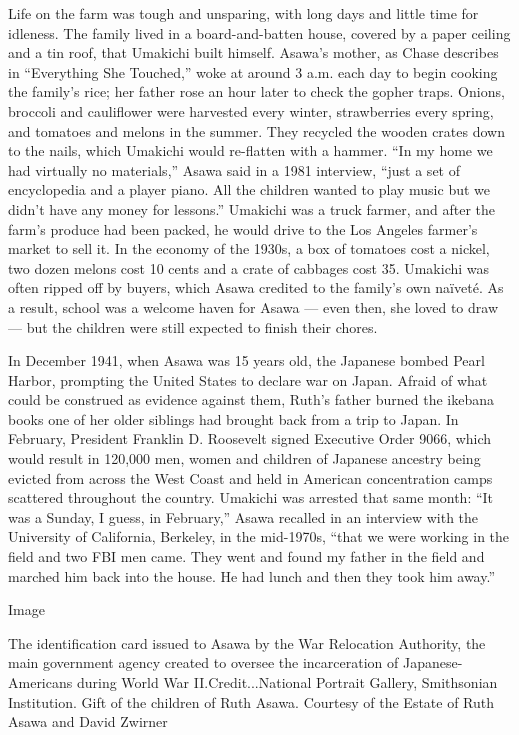 Life on the farm was tough and unsparing, with long days and little time
for idleness. The family lived in a board-and-batten house, covered by a
paper ceiling and a tin roof, that Umakichi built himself. Asawa's
mother, as Chase describes in ``Everything She Touched,'' woke at around
3 a.m. each day to begin cooking the family's rice; her father rose an
hour later to check the gopher traps. Onions, broccoli and cauliflower
were harvested every winter, strawberries every spring, and tomatoes and
melons in the summer. They recycled the wooden crates down to the nails,
which Umakichi would re-flatten with a hammer. ``In my home we had
virtually no materials,'' Asawa said in a 1981 interview, ``just a set
of encyclopedia and a player piano. All the children wanted to play
music but we didn't have any money for lessons.'' Umakichi was a truck
farmer, and after the farm's produce had been packed, he would drive to
the Los Angeles farmer's market to sell it. In the economy of the 1930s,
a box of tomatoes cost a nickel, two dozen melons cost 10 cents and a
crate of cabbages cost 35. Umakichi was often ripped off by buyers,
which Asawa credited to the family's own naïveté. As a result, school
was a welcome haven for Asawa --- even then, she loved to draw --- but
the children were still expected to finish their chores.

In December 1941, when Asawa was 15 years old, the Japanese bombed Pearl
Harbor, prompting the United States to declare war on Japan. Afraid of
what could be construed as evidence against them, Ruth's father burned
the ikebana books one of her older siblings had brought back from a trip
to Japan. In February, President Franklin D. Roosevelt signed Executive
Order 9066, which would result in 120,000 men, women and children of
Japanese ancestry being evicted from across the West Coast and held in
American concentration camps scattered throughout the country. Umakichi
was arrested that same month: ``It was a Sunday, I guess, in February,''
Asawa recalled in an interview with the University of California,
Berkeley, in the mid-1970s, ``that we were working in the field and two
FBI men came. They went and found my father in the field and marched him
back into the house. He had lunch and then they took him away.''

Image

The identification card issued to Asawa by the War Relocation Authority,
the main government agency created to oversee the incarceration of
Japanese-Americans during World War II.Credit...National Portrait
Gallery, Smithsonian Institution. Gift of the children of Ruth Asawa.
Courtesy of the Estate of Ruth Asawa and David Zwirner

